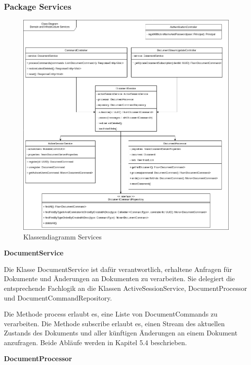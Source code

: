 \subsubsection{Package Services}

\begin{figure}[h]
    \centering
    \begin{minipage}[b]{0.8\textwidth}
        \includegraphics[width=\textwidth]{images/class-be.drawio}
        \caption{Klassendiagramm Services}
    \end{minipage}
\end{figure}


\textbf{DocumentService}

Die Klasse DocumentService ist dafür verantwortlich, erhaltene Anfragen für Dokumente und Änderungen an Dokumenten zu verarbeiten.
Sie delegiert die entsprechende Fachlogik an die Klassen ActiveSessionService, DocumentProcessor und DocumentCommandRepository.

Die Methode process erlaubt es, eine Liste von DocumentCommands zu verarbeiten.
Die Methode subscribe erlaubt es, einen Stream des aktuellen Zustands des Dokuments und aller künftigen Änderungen an einem Dokument anzufragen.
Beide Abläufe werden in Kapitel 5.4 beschrieben.

\textbf{DocumentProcessor}

